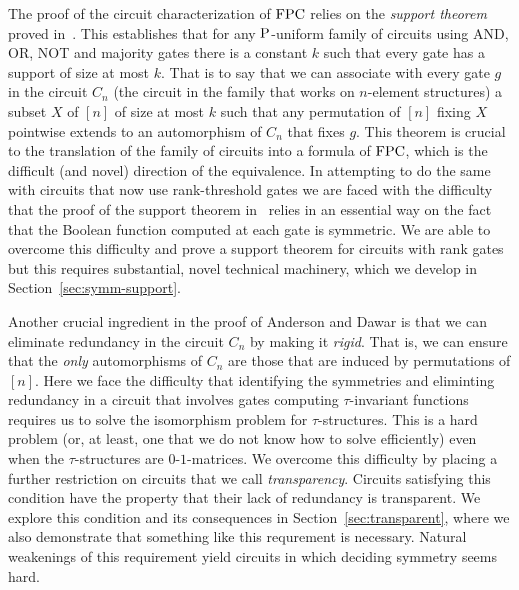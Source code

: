 \documentclass[../paper.tex]{subfiles}
\begin{document}
The proof of the circuit characterization of $\text{\upshape FPC}$ relies on the
\emph{support theorem} proved in~\cite{AndersonD17}.  This establishes
that for any $\mathrm{P}$-uniform family of circuits using AND, OR, NOT and
majority gates there is a constant $k$ such that every gate has a
support of size at most $k$.  That is to say that we can associate
with every gate $g$ in the circuit $C_n$ (the circuit in the family
that works on $n$-element structures) a subset $X$ of $[n]$ of size at
most $k$ such that any permutation of $[n]$ fixing $X$ pointwise
extends to an automorphism of $C_n$ that fixes $g$.  This theorem is
crucial to the translation of the family of circuits into a formula of
$\text{\upshape FPC}$, which is the difficult (and novel) direction of the
equivalence.  In attempting to do the same with circuits that now use
rank-threshold gates we are faced with the difficulty that the proof
of the support theorem in~\cite{AndersonD17} relies in an essential
way on the fact that the Boolean function computed at each gate is
symmetric.  We are able to overcome this difficulty and prove a
support theorem for circuits with rank gates but this requires
substantial, novel technical machinery, which we develop in
Section~\ref{sec:symm-support}. 

Another crucial ingredient in the proof of Anderson and Dawar is that
we can eliminate redundancy in the circuit $C_n$ by making it
\emph{rigid}.  That is, we can ensure that the \emph{only}
automorphisms of $C_n$ are those that are induced by permutations of
$[n]$.  Here we face the difficulty that identifying the symmetries
and eliminting redundancy in a circuit that involves gates computing
$\tau$-invariant functions requires us to solve the isomorphism
problem for $\tau$-structures.  This is a hard problem (or, at least,
one that we do not know how to solve efficiently) even when the
$\tau$-structures are $0$-$1$-matrices.  We overcome this difficulty
by placing a further restriction on circuits that we call
\emph{transparency}.  Circuits satisfying this condition have the
property that their lack of redundancy is transparent.  We explore
this condition and its consequences in Section~\ref{sec:transparent},
where we also demonstrate that something like this requrement is
necessary.  Natural weakenings of this requirement yield circuits in
which deciding symmetry seems hard.
\end{document}
